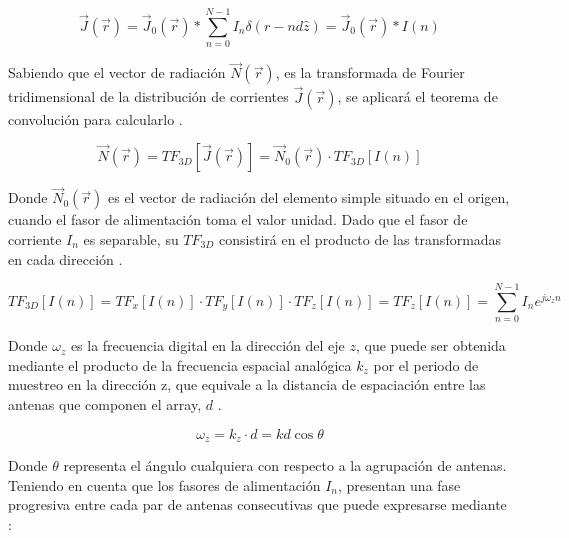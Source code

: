 \begin{equation}
	\vec{J}\left ( \vec{r} \right )=\vec{J}_{0}\left ( \vec{r} \right ) \ast \sum_{n=0}^{N-1}I_{n}\delta (r-nd\hat{z})=\vec{J}_{0}\left ( \vec{r} \right )\ast I(n)
	\label{eq:conv}
\end{equation}

\par Sabiendo que el vector de radiación $\vec{N}\left ( \vec{r} \right )$, es la transformada de Fourier tridimensional de la distribución de corrientes $\vec{J}\left ( \vec{r} \right )$, se aplicará el teorema de convolución para calcularlo \cite{Cardama2002}.

\begin{equation}
	\vec{N}\left ( \vec{r} \right )=TF_{3D}\left [\vec{J}\left ( \vec{r} \right )  \right ]=\vec{N}_{0}\left ( \vec{r} \right )\cdot TF_{3D}\left [ I(n)   \right ]
	\label{eq:3d}
\end{equation}

\par Donde $\vec{N}_{0}\left ( \vec{r} \right )$ es el vector de radiación del elemento simple situado en el origen, cuando el fasor de alimentación toma el valor unidad. Dado que el fasor de corriente $I_{n}$  es separable, su $TF_{3D}$ consistirá en el producto de las transformadas en cada dirección \cite{Cardama2002}.


\begin{equation}
	TF_{3D}\left [ I(n)   \right ]= TF_{x}\left [ I(n)   \right ]\cdot TF_{y}\left [ I(n)   \right ]\cdot TF_{z}\left [ I(n)   \right ] = TF_{z}\left [ I(n)   \right ] = \sum_{n=0}^{N-1}I_{n} e^{j\omega _{z}n}
	\label{eq:direccional}
\end{equation}

\par Donde $\omega _{z}$ es la frecuencia digital en la dirección del eje $z$, que puede ser obtenida mediante el producto de la frecuencia espacial analógica $k_{z}$  por el periodo de muestreo en la dirección z, que equivale a la distancia de espaciación entre las antenas que componen el array, $d$ \cite{Cardama2002}. 

\begin{equation}
	\omega_{z} = k_{z}\cdot d = k d \cos {\theta } 
	\label{eq:frecdigital}
\end{equation}

\par Donde $\theta$ representa el ángulo cualquiera con respecto a la agrupación de antenas. Teniendo en cuenta que los fasores de alimentación $I_{n}$, presentan una fase progresiva entre cada par de antenas consecutivas que puede expresarse mediante \cite{Cardama2002}: 

